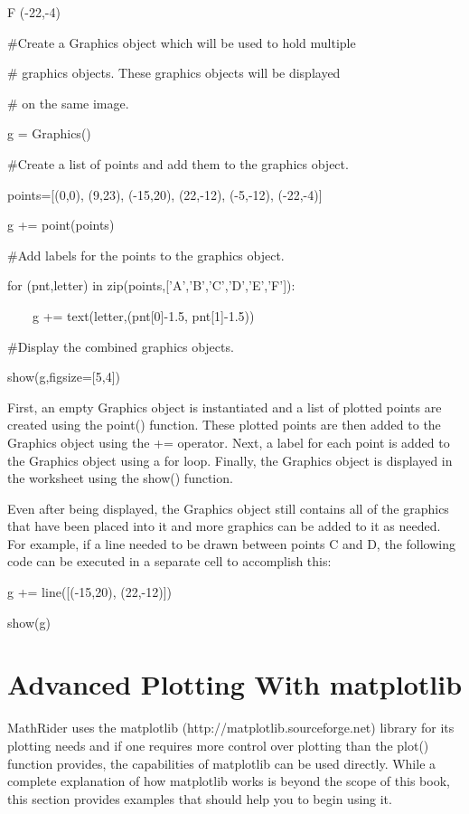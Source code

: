 \documentclass[12pt,oneside]{book}
\begin{document}
F ({}-22,{}-4)

{\textquotedbl}{\textquotedbl}{\textquotedbl}


\#Create a Graphics object which will be used to hold multiple 

\# graphics objects. These graphics objects will be displayed

\# on the same image.

g = Graphics()


\#Create a list of points and add them to the graphics object.

points=[(0,0), (9,23), ({}-15,20), (22,{}-12), ({}-5,{}-12),
({}-22,{}-4)]

g += point(points)


\#Add labels for the points to the graphics object.

for (pnt,letter) in zip(points,['A','B','C','D','E','F']):

\ \ \ \ g += text(letter,(pnt[0]{}-1.5, pnt[1]{}-1.5))


\#Display the combined graphics objects.

show(g,figsize=[5,4])

{\textbar}


First, an empty Graphics object is instantiated and a list of plotted points are created using the point() function. These plotted points are then added to the Graphics object using the += operator. Next, a label for each point is added to the Graphics object using a for loop. Finally, the Graphics object is displayed in the worksheet using the show() function. 

Even after being displayed, the Graphics object still contains all of the graphics that have been placed into it and more graphics can be added to it as needed. For example, if a line needed to be drawn between points C and D, the following code can be executed in a separate cell to accomplish this: 

g += line([({}-15,20), (22,{}-12)])

show(g)

{\textbar}
\section[Advanced Plotting With matplotlib]{Advanced Plotting With matplotlib}

MathRider uses the matplotlib (http://matplotlib.sourceforge.net) library for its plotting needs and if one requires more control over plotting than the plot() function provides, the capabilities of matplotlib can be used directly. While a complete explanation of how matplotlib works is beyond the scope of this book, this section provides examples that should help you to begin using it.
\end{document}
